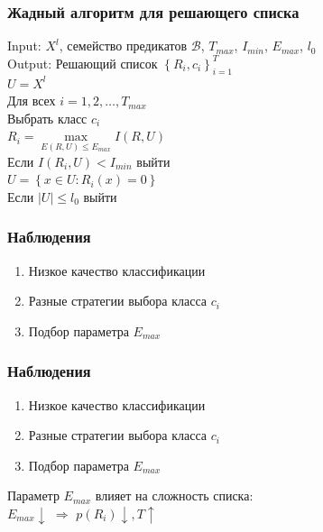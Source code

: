 \documentclass[12pt]{beamer}
\begin{document}
\begin{frame}\frametitle{Жадный алгоритм для решающего списка}
Input: $X^l$, семейство предикатов $\mathcal{B}$, $T_{max}$, $I_{min}$, $E_{max}$, $l_0$\\
Output: Решающий список $\left\{ R_i, c_i \right\}_{i=1}^T$\\
\vspace{5mm}
$U = X^l$\\
Для всех $i = 1,2,\dots,T_{max}$\\
\hspace{10mm} Выбрать класс $c_i$\\
\hspace{10mm} $R_i = \max\limits_{E(R, U) \leq E_{max}} I(R, U)$\\
\hspace{10mm} Если $I(R_i, U) < I_{min}$ выйти\\
\hspace{10mm} $U = \left\{ x \in U: R_i(x) = 0 \right\}$\\
\hspace{10mm} Если $\vert U \vert \leq l_0$ выйти
\end{frame}

\begin{frame}\frametitle{Наблюдения}
\begin{enumerate}[--]
\item Низкое качество классификации
\item Разные стратегии выбора класса $c_i$
\item Подбор параметра $E_{max}$
\end{enumerate}
\end{frame}

\begin{frame}\frametitle{Наблюдения}
\begin{enumerate}[--]
\item Низкое качество классификации
\item Разные стратегии выбора класса $c_i$
\item Подбор параметра $E_{max}$
\end{enumerate}
\vspace{5mm}
Параметр $E_{max}$ влияет на сложность списка:\\
$E_{max} \downarrow$ $\Rightarrow$ $p(R_i) \downarrow, T \uparrow$
\end{frame}
\end{document}
